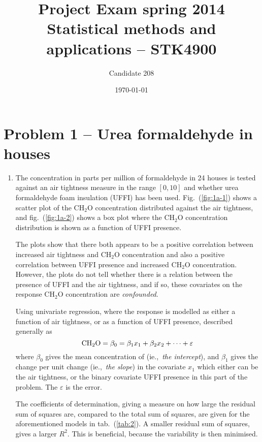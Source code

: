 \documentclass[a4paper,11pt]{article}
\date{\today}
\title{Project Exam spring 2014\\ \small{Statistical methods and applications -- STK4900}}
\author{Candidate 208}
\newcommand{\CHHO}{\text{CH\ensuremath{_2}O} }
\begin{document}
\onecolumn
\maketitle{}


\section*{Problem 1 -- Urea formaldehyde in houses}

\begin{enumerate}[label=1\alph*)]
    \item The concentration in parts per million of formaldehyde in 24 houses is tested against an air tightness measure in the range $[0,10]$ and whether urea formaldehyde foam insulation (UFFI) has been used. Fig.~(\ref{fig:1a-1}) shows a scatter plot of the CH$_2$O concentration distributed against the air tightness, and fig.~(\ref{fig:1a-2}) shows a box plot where the CH$_2$O concentration distribution is shown as a function of UFFI presence. 

        The plots show that there both appears to be a positive correlation between increased air tightness and CH$_2$O concentration and also a positive correlation between UFFI presence and increased CH$_2$O concentration. However, the plots do not tell whether there is a relation between the presence of UFFI and the air tightness, and if so, these covariates on the response CH$_2$O concentration are \textit{confounded}. 

        Using univariate regression, where the response \CHHO is modelled as either a function of air tightness, or as a function of UFFI presence, described generally as
        \begin{equation}
            {\rm CH_2O} = \beta_0 = \beta_1 x_1 + \beta_2 x_2 + \dots + \varepsilon
            \label{eq:linmod}
        \end{equation}
        where $\beta_0$ gives the mean concentration of \CHHO (ie.,~\textit{the intercept}), and $\beta_1$ gives the change per unit change (ie.,~\textit{the slope}) in the covariate $x_1$ which either can be the air tightness, or the binary covariate UFFI presence in this part of the problem. The $\varepsilon$ is the error. 

        The coefficients of determination, giving a measure on how large the residual sum of squares are, compared to the total sum of squares, are given for the aforementioned models in tab.~(\ref{tab:2}). A smaller residual sum of squares, gives a larger $R^2$.  This is beneficial, because the variability is then minimised.


\end{enumerate}
\end{document}
